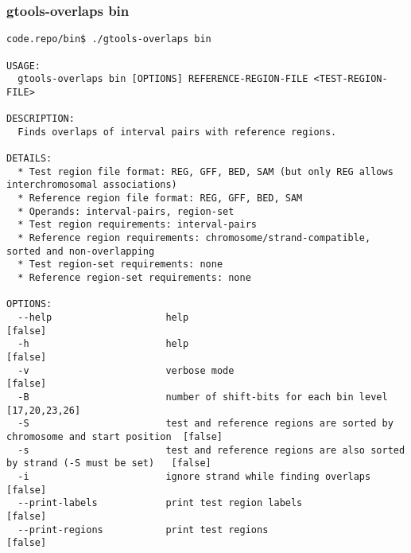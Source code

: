 \subsubsection{gtools-overlaps bin}\label{gtools-overlaps_bin}
\begin{lstlisting}
code.repo/bin$ ./gtools-overlaps bin

USAGE:
  gtools-overlaps bin [OPTIONS] REFERENCE-REGION-FILE <TEST-REGION-FILE>

DESCRIPTION:
  Finds overlaps of interval pairs with reference regions.

DETAILS:
  * Test region file format: REG, GFF, BED, SAM (but only REG allows interchromosomal associations)
  * Reference region file format: REG, GFF, BED, SAM
  * Operands: interval-pairs, region-set
  * Test region requirements: interval-pairs
  * Reference region requirements: chromosome/strand-compatible, sorted and non-overlapping
  * Test region-set requirements: none
  * Reference region-set requirements: none

OPTIONS:
  --help                    help                                                                    [false]
  -h                        help                                                                    [false]
  -v                        verbose mode                                                            [false]
  -B                        number of shift-bits for each bin level                                 [17,20,23,26]
  -S                        test and reference regions are sorted by chromosome and start position  [false]
  -s                        test and reference regions are also sorted by strand (-S must be set)   [false]
  -i                        ignore strand while finding overlaps                                    [false]
  --print-labels            print test region labels                                                [false]
  --print-regions           print test regions                                                      [false]
\end{lstlisting}
%
